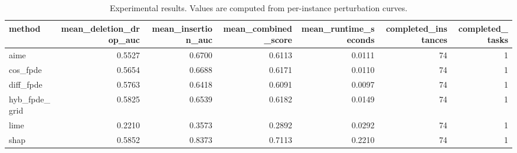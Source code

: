 \begin{table}[t]
\caption{Experimental results. Values are computed from per-instance perturbation curves.}
\label{tab:main_results_computed}
\centering
\begin{tabular}{lrrrrrr}
\toprule
method & mean\_deletion\_drop\_auc & mean\_insertion\_auc & mean\_combined\_score & mean\_runtime\_seconds & completed\_instances & completed\_tasks \\
\midrule
aime & 0.5527 & 0.6700 & 0.6113 & 0.0111 & 74 & 1 \\
cos\_fpde & 0.5654 & 0.6688 & 0.6171 & 0.0110 & 74 & 1 \\
diff\_fpde & 0.5763 & 0.6418 & 0.6091 & 0.0097 & 74 & 1 \\
hyb\_fpde\_grid & 0.5825 & 0.6539 & 0.6182 & 0.0149 & 74 & 1 \\
lime & 0.2210 & 0.3573 & 0.2892 & 0.0292 & 74 & 1 \\
shap & 0.5852 & 0.8373 & 0.7113 & 0.2210 & 74 & 1 \\
\bottomrule
\end{tabular}

\end{table}
